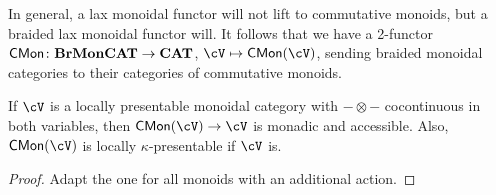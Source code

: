 \documentclass[a4paper,11pt,oneside,openany]{scrbook}
\begin{document}
\begin{rmk}
    In general, a lax monoidal functor will not lift to commutative monoids, but a braided lax monoidal functor will. It follows that we have a 2-functor $\operatorname{\mathsf{CMon}}\colon\textbf{BrMonCAT}\rightarrow{\normalfont\textbf{CAT}}$, $\cV\mapsto\CMon(\cV)$, sending braided monoidal categories to their categories of commutative monoids.
\end{rmk}

\begin{thm}
    If $\cV$ is a locally presentable monoidal category with $-\otimes -$ cocontinuous in both variables, then $\CMon(\cV)\rightarrow\cV$ is monadic and accessible. Also, $\CMon(\cV)$ is locally $\kappa$-presentable if $\cV$ is.
\end{thm}

\begin{proof}
    Adapt the one for all monoids with an additional action.
\end{proof}
\end{document}
